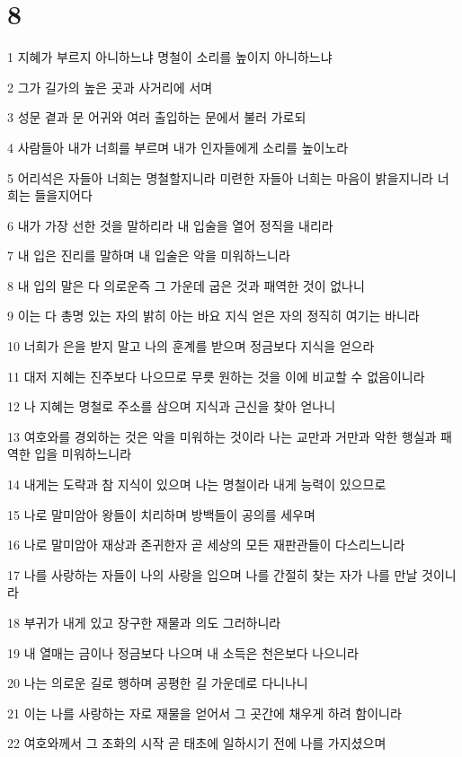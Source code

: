 \chapter{8}

\par 1 지혜가 부르지 아니하느냐 명철이 소리를 높이지 아니하느냐
\par 2 그가 길가의 높은 곳과 사거리에 서며
\par 3 성문 곁과 문 어귀와 여러 출입하는 문에서 불러 가로되
\par 4 사람들아 내가 너희를 부르며 내가 인자들에게 소리를 높이노라
\par 5 어리석은 자들아 너희는 명철할지니라 미련한 자들아 너희는 마음이 밝을지니라 너희는 들을지어다
\par 6 내가 가장 선한 것을 말하리라 내 입술을 열어 정직을 내리라
\par 7 내 입은 진리를 말하며 내 입술은 악을 미워하느니라
\par 8 내 입의 말은 다 의로운즉 그 가운데 굽은 것과 패역한 것이 없나니
\par 9 이는 다 총명 있는 자의 밝히 아는 바요 지식 얻은 자의 정직히 여기는 바니라
\par 10 너희가 은을 받지 말고 나의 훈계를 받으며 정금보다 지식을 얻으라
\par 11 대저 지혜는 진주보다 나으므로 무릇 원하는 것을 이에 비교할 수 없음이니라
\par 12 나 지혜는 명철로 주소를 삼으며 지식과 근신을 찾아 얻나니
\par 13 여호와를 경외하는 것은 악을 미워하는 것이라 나는 교만과 거만과 악한 행실과 패역한 입을 미워하느니라
\par 14 내게는 도략과 참 지식이 있으며 나는 명철이라 내게 능력이 있으므로
\par 15 나로 말미암아 왕들이 치리하며 방백들이 공의를 세우며
\par 16 나로 말미암아 재상과 존귀한자 곧 세상의 모든 재판관들이 다스리느니라
\par 17 나를 사랑하는 자들이 나의 사랑을 입으며 나를 간절히 찾는 자가 나를 만날 것이니라
\par 18 부귀가 내게 있고 장구한 재물과 의도 그러하니라
\par 19 내 열매는 금이나 정금보다 나으며 내 소득은 천은보다 나으니라
\par 20 나는 의로운 길로 행하며 공평한 길 가운데로 다니나니
\par 21 이는 나를 사랑하는 자로 재물을 얻어서 그 곳간에 채우게 하려 함이니라
\par 22 여호와께서 그 조화의 시작 곧 태초에 일하시기 전에 나를 가지셨으며
